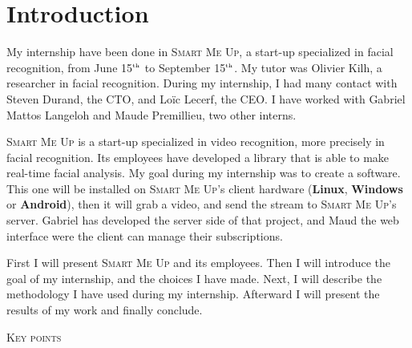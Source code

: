 \documentclass[a4paper,11pt]{custom}
\newcommand{\smu}{\textsc{Smart Me Up}\xspace}
\newcommand{\linux}{\textbf{Linux}\xspace}
\newcommand{\win}{\textbf{Windows}\xspace}
\newcommand{\android}{\textbf{Android}\xspace}
\newcommand{\nth}[1]{#1$^{\text{\tiny th}\xspace}$}
\begin{document}


\chapter{Introduction}

My internship have been done in \smu, a start-up specialized in facial
recognition, from June \nth{15} to September \nth{15}. My tutor was Olivier
Kilh, a researcher in facial recognition. During my internship, I had many
contact with Steven Durand, the CTO, and Loïc Lecerf, the CEO. I have worked with
Gabriel Mattos Langeloh and Maude Premillieu, two other interns.

\smu{} is a start-up specialized in video recognition, more precisely in facial
recognition. Its employees have developed a library that is able to make
real-time facial analysis. My goal during my internship was to create a
software. This one will be installed on \smu's client hardware (\linux, \win{}
or \android), then it will grab a video, and send the stream to \smu's server.
Gabriel has developed the server side of that project, and Maud the web
interface were the client can manage their subscriptions.

First I will present \smu{} and its employees. Then I will introduce the goal of
my internship, and the choices I have made. Next, I will describe the
methodology I have used during my internship. Afterward I will present the
results of my work and finally conclude.

\vspace{\fill}

\begin{center}
\textsc{\textsc{Key points}}
\end{center}
\end{document}
